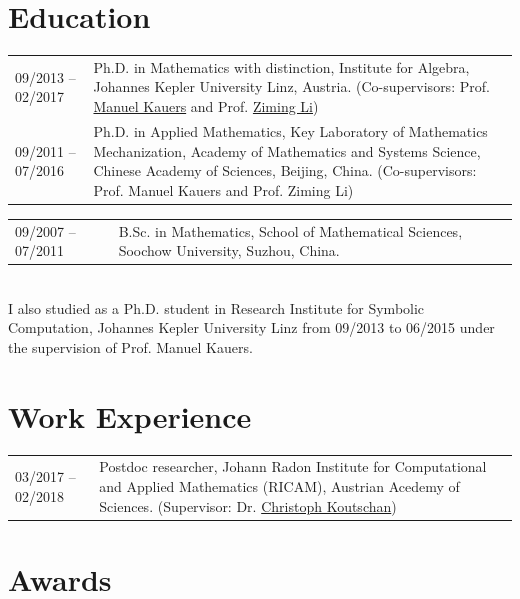 \documentclass[a4paper,12pt]{article}
\begin{document}
\section*{\Large{Education}}

\vspace{.05in}
\begin{tabular}{@{}p{1.4in}p{4in}}
09/2013 -- 02/2017    & Ph.D. in Mathematics with distinction, 
                        Institute for Algebra, 
                        Johannes Kepler University Linz, Austria. 
                        (Co-supervisors: Prof. \href{http://www.kauers.de/}{Manuel Kauers} and 
                        Prof. \href{http://mmrc.iss.ac.cn/~zmli/}{Ziming Li})\\
09/2011 -- 07/2016    & Ph.D. in Applied Mathematics, 
                        Key Laboratory of Mathematics Mechanization, 
                        Academy of Mathematics and Systems Science, 
                        Chinese Academy of Sciences, Beijing, China. 
                        (Co-supervisors: Prof. Manuel Kauers and Prof. Ziming Li)\\
\end{tabular}
\begin{tabular}{@{}p{1.4in}p{4in}}
09/2007 -- 07/2011    & B.Sc. in Mathematics, School of Mathematical Sciences, 
                        Soochow University, Suzhou, China.  
\end{tabular} \\

\noindent I also studied as a Ph.D. student in Research Institute for Symbolic Computation, Johannes Kepler University Linz 
from 09/2013 to 06/2015 under the supervision of Prof. Manuel Kauers. 


\section*{\Large{Work Experience}}

\vspace{.05in}
\begin{tabular}{@{}p{1.4in}p{4in}}
03/2017 -- 02/2018    & Postdoc researcher, 
                        Johann Radon Institute for Computational and Applied Mathematics (RICAM),
                        Austrian Acedemy of Sciences. 
                        (Supervisor: Dr. \href{http://www.koutschan.de/}{Christoph Koutschan})\\
\end{tabular}
\section*{\Large{Awards}}
\end{document}
